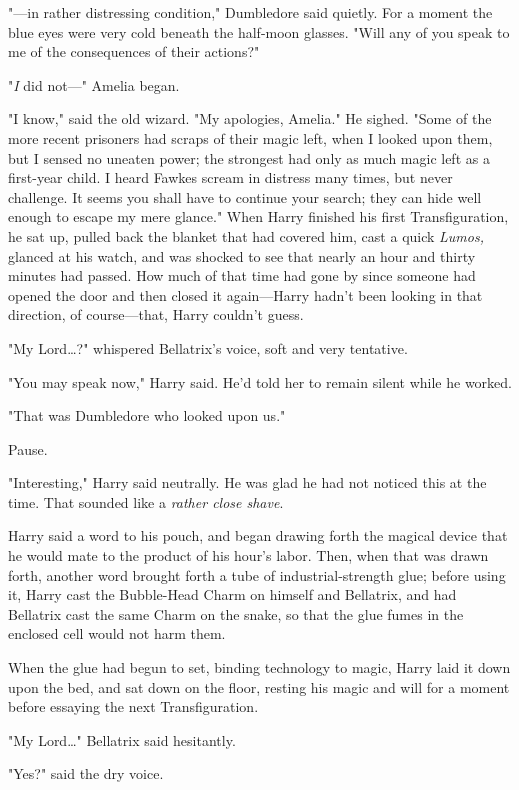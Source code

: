 "---in rather distressing condition," Dumbledore said quietly. For a moment the 
blue eyes were very cold beneath the half-moon glasses. "Will any of you speak 
to me of the consequences of their actions?"

"\emph{I} did not---" Amelia began.

"I know," said the old wizard. "My apologies, Amelia." He sighed. "Some of the 
more recent prisoners had scraps of their magic left, when I looked upon them, 
but I sensed no uneaten power; the strongest had only as much magic left as a 
first-year child. I heard Fawkes scream in distress many times, but never 
challenge. It seems you shall have to continue your search; they can hide well 
enough to escape my mere glance."
\sbreak
When Harry finished his first Transfiguration, he sat up, pulled back the 
blanket that had covered him, cast a quick \emph{Lumos,} glanced at his watch, 
and was shocked to see that nearly an hour and thirty minutes had passed. How 
much of that time had gone by since someone had opened the door and then closed 
it again---Harry hadn't been looking in that direction, of course---that, Harry 
couldn't guess.

"My Lord{\ldots}?" whispered Bellatrix's voice, soft and very tentative.

"You may speak now," Harry said. He'd told her to remain silent while he worked.

"That was Dumbledore who looked upon us."

Pause.

"Interesting," Harry said neutrally. He was glad he had not noticed this at the 
time. That sounded like a \emph{rather close shave}.

Harry said a word to his pouch, and began drawing forth the magical device that 
he would mate to the product of his hour's labor. Then, when that was drawn 
forth, another word brought forth a tube of industrial-strength glue; before 
using it, Harry cast the Bubble-Head Charm on himself and Bellatrix, and had 
Bellatrix cast the same Charm on the snake, so that the glue fumes in the 
enclosed cell would not harm them.

When the glue had begun to set, binding technology to magic, Harry laid it down 
upon the bed, and sat down on the floor, resting his magic and will for a 
moment before essaying the next Transfiguration.

"My Lord{\ldots}" Bellatrix said hesitantly.

"Yes?" said the dry voice.

